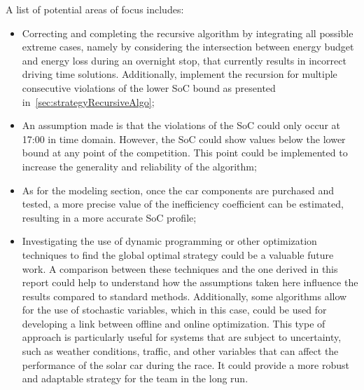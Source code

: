 A list of potential areas of focus includes:
\begin{itemize}
	\item Correcting and completing the recursive algorithm by integrating all possible extreme cases, namely by considering the intersection between energy budget and energy loss during an overnight stop, that currently results in incorrect driving time solutions. Additionally, implement the recursion for multiple consecutive violations of the lower SoC bound as presented in~\cref{sec:strategyRecursiveAlgo};
	\item An assumption made is that the violations of the SoC could only occur at 17:00 in time domain. However, the SoC could show values below the lower bound at any point of the competition. This point could be implemented to increase the generality and reliability of the algorithm;
	\item As for the modeling section, once the car components are purchased and tested, a more precise value of the inefficiency coefficient can be estimated, resulting in a more accurate SoC profile;
	\item Investigating the use of dynamic programming or other optimization techniques to find the global optimal strategy could be a valuable future work. A comparison between these techniques and the one derived in this report could help to understand how the assumptions taken here influence the results compared to standard methods. Additionally, some algorithms allow for the use of stochastic variables, which in this case, could be used for developing a link between offline and online optimization. This type of approach is particularly useful for systems that are subject to uncertainty, such as weather conditions, traffic, and other variables that can affect the performance of the solar car during the race. It could provide a more robust and adaptable strategy for the team in the long run.
\end{itemize}
